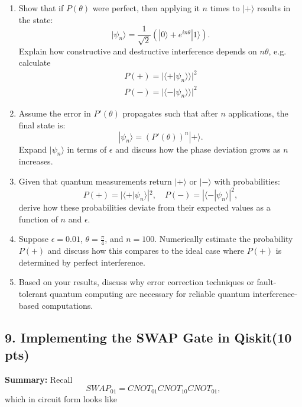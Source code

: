 \documentclass[12pt]{article}
\begin{document}
\begin{enumerate}
    \item Show that if \( P(\theta) \) were perfect, then applying it \( n \) times to \( |+\rangle \) results in the state:
    \[
    |\psi_n\rangle = \frac{1}{\sqrt{2}} (|0\rangle + e^{in\theta} |1\rangle).
    \]
    Explain how constructive and destructive interference depends on \( n \theta \), e.g. calculate
    \begin{align*}
        P(+) = |\langle + | \psi_n \rangle \rangle|^2 \\ 
        P(-) = |\langle - | \psi_n \rangle \rangle|^2 
    \end{align*}
    
    \item Assume the error in \( P'(\theta) \) propagates such that after \( n \) applications, the final state is:
    \[
    |\psi_n\rangle = (P'(\theta))^n |+\rangle.
    \]
    Expand \( |\psi_n\rangle \) in terms of \( \epsilon \) and discuss how the phase deviation grows as \( n \) increases.
    
    \item Given that quantum measurements return \( |+\rangle \) or \( |-\rangle \) with probabilities:
    \[
    P(+) = |\langle + | \psi_n \rangle|^2, \quad P(-) = |\langle - | \psi_n \rangle|^2,
    \]
    derive how these probabilities deviate from their expected values as a function of \( n \) and \( \epsilon \).
    
    \item Suppose \( \epsilon = 0.01 \), \( \theta = \frac{\pi}{4} \), and \( n = 100 \). Numerically estimate the probability \( P(+) \) and discuss how this compares to the ideal case where \( P(+) \) is determined by perfect interference.
    
    \item Based on your results, discuss why error correction techniques or fault-tolerant quantum computing are necessary for reliable quantum interference-based computations.
\end{enumerate}
\subsection*{9. Implementing the SWAP Gate in Qiskit(10 pts)}

\textbf{Summary:} Recall \begin{equation*}
    SWAP_{01} = CNOT_{01}CNOT_{10}CNOT_{01},
\end{equation*}
which in circuit form looks like 
\end{document}
